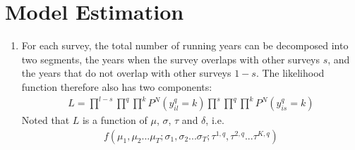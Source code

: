 \documentclass{article}
\begin{document}

\section{Model Estimation}
\begin{enumerate}
    \item For each survey, the total number of running years can be decomposed into two segments, the years when the survey overlaps  with other surveys $s$, and the years that do not overlap with other surveys $1-s$.  The likelihood function therefore also has two components: 
    \begin{align}
    L=  \prod^{l-s}\prod^{q}\prod^{k}P^N(y_{il}^q = k) \prod^s\prod^q\prod^{k}P^N(y_{is}^q = k)
    \end{align}
 Noted that $L$ is a function of $\mu$, $\sigma$, $\tau$ and $\delta$, i.e.
 \begin{align}
     f(\mu_1,\mu_2... \mu_T; \sigma_1,\sigma_2...\sigma_T;\tau^{1,q},\tau^{2,q}...\tau^{K,q})  
\end{align}



  
\end{enumerate}
\end{document}
